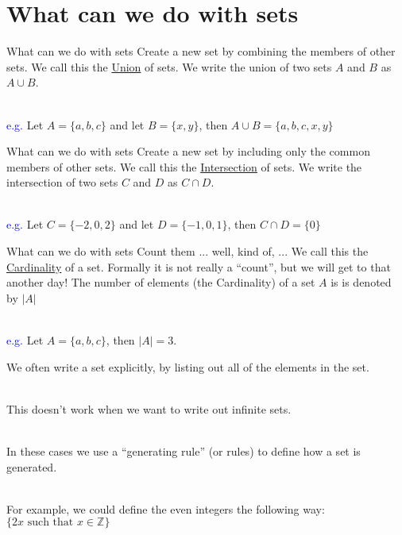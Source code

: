 \documentclass{beamer}
\begin{document}
\section{What can we do with sets}

\begin{frame}{What can we do with sets}
    Create a new set by combining the members of other sets. We call this the \underline{Union} of sets.
    We write the union of two sets $A$ and $B$ as $A \cup B$. \\~\

    \textcolor{blue}{e.g.} Let $A = \{a, b, c\}$ and let $B = \{x, y\}$, then $A \cup B = \{a, b, c, x, y\}$
\end{frame}

\begin{frame}{What can we do with sets}
    Create a new set by including only the common members of other sets. We call this the \underline{Intersection} of sets.
    We write the intersection of two sets $C$ and $D$ as $C \cap D$. \\~\

    \textcolor{blue}{e.g.} Let $C = \{-2, 0, 2\}$ and let $D = \{-1, 0, 1\}$, then $C \cap D = \{0\}$
\end{frame}

\begin{frame}{What can we do with sets}
    Count them ... well, kind of, ... We call this the \underline{Cardinality} of a set.
    Formally it is not really a ``count'', but we will get to that another day!
    The number of elements (the Cardinality) of a set $A$ is is denoted by $|A|$ \\~\

    \textcolor{blue}{e.g.} Let $A = \{a, b, c\}$, then $|A| = 3$.
\end{frame}

\begin{frame}
    We often write a set explicitly, by listing out all of the elements in the set. \\~\

    This doesn't work when we want to write out infinite sets. \\~\

    In these cases we use a ``generating rule'' (or rules) to define how a set is generated. \\~\

    For example, we could define the even integers the following way: $\{2x \text{ such that } x \in \mathbb{Z}\}$
\end{frame}
\end{document}
